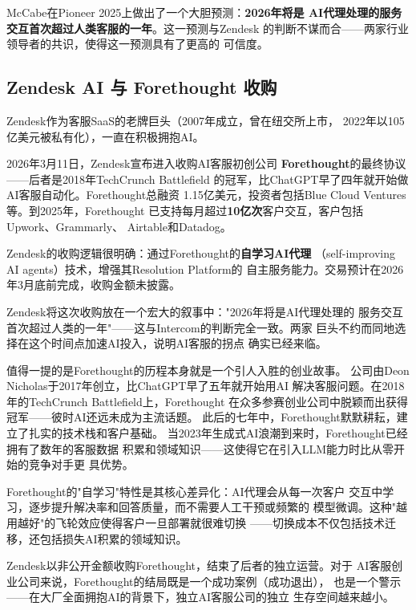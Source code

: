 McCabe在Pioneer 2025上做出了一个大胆预测：\textbf{2026年将是
AI代理处理的服务交互首次超过人类客服的一年}。这一预测与Zendesk
的判断不谋而合——两家行业领导者的共识，使得这一预测具有了更高的
可信度。

\subsection{Zendesk AI 与 Forethought 收购}
\label{subsec:zendesk-forethought}

Zendesk作为客服SaaS的老牌巨头（2007年成立，曾在纽交所上市，
2022年以105亿美元被私有化），一直在积极拥抱AI。

2026年3月11日，Zendesk宣布进入收购AI客服初创公司
\textbf{Forethought}的最终协议——后者是2018年TechCrunch Battlefield
的冠军，比ChatGPT早了四年就开始做AI客服自动化。Forethought总融资
1.15亿美元，投资者包括Blue Cloud Ventures等。到2025年，Forethought
已支持每月超过\textbf{10亿次}客户交互，客户包括Upwork、Grammarly、
Airtable和Datadog。

Zendesk的收购逻辑很明确：通过Forethought的\textbf{自学习AI代理}
（self-improving AI agents）技术，增强其Resolution Platform的
自主服务能力。交易预计在2026年3月底前完成，收购金额未披露。

Zendesk将这次收购放在一个宏大的叙事中："2026年将是AI代理处理的
服务交互首次超过人类的一年"——这与Intercom的判断完全一致。两家
巨头不约而同地选择在这个时间点加速AI投入，说明AI客服的拐点
确实已经来临。

值得一提的是Forethought的历程本身就是一个引人入胜的创业故事。
公司由Deon Nicholas于2017年创立，比ChatGPT早了五年就开始用AI
解决客服问题。在2018年的TechCrunch Battlefield上，Forethought
在众多参赛创业公司中脱颖而出获得冠军——彼时AI还远未成为主流话题。
此后的七年中，Forethought默默耕耘，建立了扎实的技术栈和客户基础。
当2023年生成式AI浪潮到来时，Forethought已经拥有了数年的客服数据
积累和领域知识——这使得它在引入LLM能力时比从零开始的竞争对手更
具优势。

Forethought的"自学习"特性是其核心差异化：AI代理会从每一次客户
交互中学习，逐步提升解决率和回答质量，而不需要人工干预或频繁的
模型微调。这种"越用越好"的飞轮效应使得客户一旦部署就很难切换
——切换成本不仅包括技术迁移，还包括损失AI积累的领域知识。

Zendesk以非公开金额收购Forethought，结束了后者的独立运营。对于
AI客服创业公司来说，Forethought的结局既是一个成功案例（成功退出），
也是一个警示——在大厂全面拥抱AI的背景下，独立AI客服公司的独立
生存空间越来越小。

